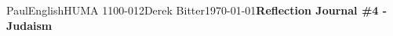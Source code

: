 \documentclass[12pt,letterpaper]{article}
\begin{document}
\begin{mla}{Paul}{English}{HUMA 1100-012}{Derek Bitter}{\today}{\textbf{Reflection Journal \#4 - Judaism}}







\end{mla}
\end{document}
